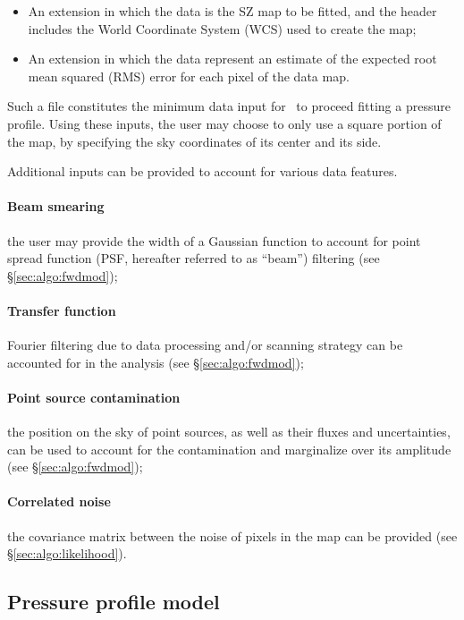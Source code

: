 \begin{itemize}[leftmargin=*]
    \item An extension in which the data is the SZ map to be fitted, and the header includes the World Coordinate System (WCS) used to create the map;
    \item An extension in which the data represent an estimate of the expected root mean squared (RMS) error for each pixel of the data map.
\end{itemize}

Such a file constitutes the minimum data input for \panco\ to proceed fitting a pressure profile.
Using these inputs, the user may choose to only use a square portion of the map, by specifying the sky coordinates of its center and its side.

Additional inputs can be provided to account for various data features.
\paragraph{Beam smearing} the user may provide the width of a Gaussian function to account for point spread function (PSF, hereafter referred to as ``beam'') filtering (see \S\ref{sec:algo:fwdmod});
\paragraph{Transfer function} Fourier filtering due to data processing and/or scanning strategy can be accounted for in the analysis (see \S\ref{sec:algo:fwdmod});
\paragraph{Point source contamination} the position on the sky of point sources, as well as their fluxes and uncertainties, can be used to account for the contamination and marginalize over its amplitude (see \S\ref{sec:algo:fwdmod});
\paragraph{Correlated noise} the covariance matrix between the noise of pixels in the map can be provided (see \S\ref{sec:algo:likelihood}).

\subsection{Pressure profile model} \label{sec:algo:press}

